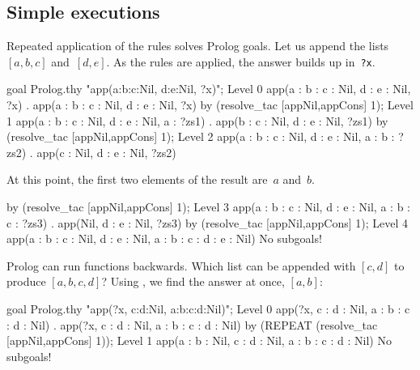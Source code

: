 \subsection{Simple executions}
Repeated application of the rules solves Prolog goals.  Let us
append the lists $[a,b,c]$ and~$[d,e]$.  As the rules are applied, the
answer builds up in~{\tt ?x}.
\begin{ttbox}
goal Prolog.thy "app(a:b:c:Nil, d:e:Nil, ?x)";
{\out Level 0}
{\out app(a : b : c : Nil, d : e : Nil, ?x)}
{. app(a : b : c : Nil, d : e : Nil, ?x)}
\ttbreak
by (resolve_tac [appNil,appCons] 1);
{\out Level 1}
{\out app(a : b : c : Nil, d : e : Nil, a : ?zs1)}
{. app(b : c : Nil, d : e : Nil, ?zs1)}
\ttbreak
by (resolve_tac [appNil,appCons] 1);
{\out Level 2}
{\out app(a : b : c : Nil, d : e : Nil, a : b : ?zs2)}
{. app(c : Nil, d : e : Nil, ?zs2)}
\end{ttbox}
At this point, the first two elements of the result are~$a$ and~$b$.
\begin{ttbox}
by (resolve_tac [appNil,appCons] 1);
{\out Level 3}
{\out app(a : b : c : Nil, d : e : Nil, a : b : c : ?zs3)}
{. app(Nil, d : e : Nil, ?zs3)}
\ttbreak
by (resolve_tac [appNil,appCons] 1);
{\out Level 4}
{\out app(a : b : c : Nil, d : e : Nil, a : b : c : d : e : Nil)}
{\out No subgoals!}
\end{ttbox}

Prolog can run functions backwards.  Which list can be appended
with $[c,d]$ to produce $[a,b,c,d]$?
Using , we find the answer at once, $[a,b]$:
\begin{ttbox}
goal Prolog.thy "app(?x, c:d:Nil, a:b:c:d:Nil)";
{\out Level 0}
{\out app(?x, c : d : Nil, a : b : c : d : Nil)}
{. app(?x, c : d : Nil, a : b : c : d : Nil)}
\ttbreak
by (REPEAT (resolve_tac [appNil,appCons] 1));
{\out Level 1}
{\out app(a : b : Nil, c : d : Nil, a : b : c : d : Nil)}
{\out No subgoals!}
\end{ttbox}


